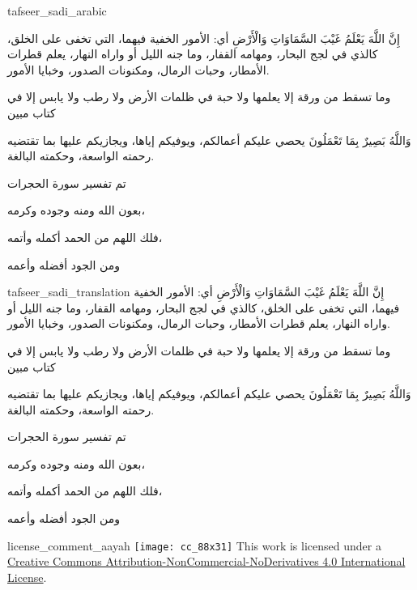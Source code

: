 \begin{taggedblock}{tafseer_sadi_arabic}
\begin{Arabic}
{ إِنَّ اللَّهَ يَعْلَمُ غَيْبَ السَّمَاوَاتِ وَالْأَرْضِ }
أي: الأمور الخفية فيهما، التي تخفى على الخلق، كالذي في لجج البحار، ومهامه القفار، وما جنه الليل أو واراه النهار، يعلم قطرات الأمطار، وحبات الرمال، ومكنونات الصدور، وخبايا الأمور.

{ وما تسقط من ورقة إلا يعلمها ولا حبة في ظلمات الأرض ولا رطب ولا يابس إلا في كتاب مبين }

{ وَاللَّهُ بَصِيرٌ بِمَا تَعْمَلُونَ }
يحصي عليكم أعمالكم، ويوفيكم إياها، ويجازيكم عليها بما تقتضيه رحمته الواسعة، وحكمته البالغة.

تم تفسير سورة الحجرات

بعون الله ومنه وجوده وكرمه،

فلك اللهم من الحمد أكمله وأتمه،

ومن الجود أفضله وأعمه
\end{Arabic}
\end{taggedblock}
\begin{taggedblock}{tafseer_sadi_translation}
{ إِنَّ اللَّهَ يَعْلَمُ غَيْبَ السَّمَاوَاتِ وَالْأَرْضِ }
أي: الأمور الخفية فيهما، التي تخفى على الخلق، كالذي في لجج البحار، ومهامه القفار، وما جنه الليل أو واراه النهار، يعلم قطرات الأمطار، وحبات الرمال، ومكنونات الصدور، وخبايا الأمور.

{ وما تسقط من ورقة إلا يعلمها ولا حبة في ظلمات الأرض ولا رطب ولا يابس إلا في كتاب مبين }

{ وَاللَّهُ بَصِيرٌ بِمَا تَعْمَلُونَ }
يحصي عليكم أعمالكم، ويوفيكم إياها، ويجازيكم عليها بما تقتضيه رحمته الواسعة، وحكمته البالغة.

تم تفسير سورة الحجرات

بعون الله ومنه وجوده وكرمه،

فلك اللهم من الحمد أكمله وأتمه،

ومن الجود أفضله وأعمه
\end{taggedblock}
\begin{taggedblock}{license_comment_aayah}
\texttt{[image: cc\_88x31]}
This work is licensed under a 
\href{http://creativecommons.org/licenses/by-nc-nd/4.0/}{Creative Commons Attribution-NonCommercial-NoDerivatives 4.0 International License}.
\end{taggedblock}
\begin{comment}
Please use the following for footnotes:- Sample\footnoteQ{Text of Qur'an footnote goes here.}.
Sample\footnoteT{Text of Tafseer footnote goes here.}.
\end{comment}